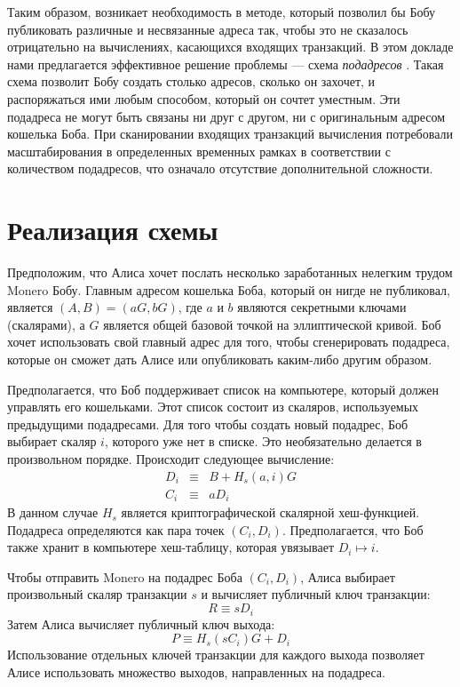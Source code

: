 \documentclass{mrl}
\begin{document}
Таким образом, возникает необходимость в методе, который позволил бы Бобу публиковать различные и несвязанные адреса так, чтобы это не сказалось отрицательно на вычислениях, касающихся входящих транзакций. В этом докладе нами предлагается эффективное решение проблемы — схема \textit{подадресов} \cite{pr}. Такая схема позволит Бобу создать столько адресов, сколько он захочет, и распоряжаться ими любым способом, который он сочтет уместным. Эти подадреса не могут быть связаны ни друг с другом, ни с оригинальным адресом кошелька Боба. При сканировании входящих транзакций вычисления потребовали масштабирования в определенных временных рамках в соответствии с количеством подадресов, что означало отсутствие дополнительной сложности.


\section{Реализация схемы}
Предположим, что Алиса хочет послать несколько заработанных нелегким трудом Monero Бобу. Главным адресом кошелька Боба, который он нигде не публиковал, является $(A,B) = (aG, bG)$, где $a$ и $b$ являются секретными ключами (скалярами), а $G$ является общей базовой точкой на эллиптической кривой. Боб хочет использовать свой главный адрес для того, чтобы сгенерировать подадреса, которые он сможет дать Алисе или опубликовать каким-либо другим образом.

Предполагается, что Боб поддерживает список на компьютере, который должен управлять его кошельками. Этот список состоит из скаляров, используемых предыдущими подадресами. Для того чтобы создать новый подадрес, Боб выбирает скаляр $i$, которого уже нет в списке. Это необязательно делается в произвольном порядке. Происходит следующее вычисление:
\begin{eqnarray*}
D_i &\equiv& B + H_s(a,i)G \\
C_i &\equiv& aD_i
\end{eqnarray*}
В данном случае $H_s$ является криптографической скалярной хеш-функцией. Подадреса определяются как пара точек $(C_i,D_i)$. Предполагается, что Боб также хранит в компьютере хеш-таблицу, которая увязывает $D_i \mapsto i$.

Чтобы отправить Monero на подадрес Боба $(C_i,D_i)$, Алиса выбирает произвольный скаляр транзакции $s$ и вычисляет публичный ключ транзакции:
$$R \equiv sD_i$$
Затем Алиса вычисляет публичный ключ выхода:
$$P \equiv H_s(sC_i)G + D_i$$
Использование отдельных ключей транзакции для каждого выхода позволяет Алисе использовать множество выходов, направленных на подадреса.
\end{document}
